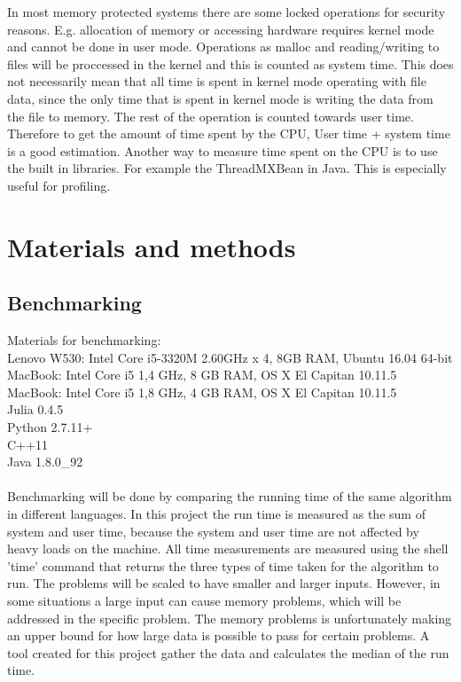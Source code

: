 \documentclass[a4paper, 11pt, titlepage]{article}
\begin{document}
In most memory protected systems there are some locked operations for security reasons. E.g. allocation of memory or accessing hardware requires kernel mode and cannot be done in user mode. Operations as malloc and reading/writing to files will be proccessed in the kernel and this is counted as system time. This does not necessarily mean that all time is spent in kernel mode operating with file data, since the only time that is spent in kernel mode is writing the data from the file to memory. The rest of the operation is counted towards user time. Therefore to get the amount of time spent by the CPU, User time + system time is a good estimation. Another way to measure time spent on the CPU is to use the built in libraries. For example the ThreadMXBean in Java. This is especially useful for profiling.

\section{Materials and methods}
\subsection{Benchmarking}
Materials for benchmarking: \\
Lenovo W530: Intel Core i5-3320M 2.60GHz x 4, 8GB RAM, Ubuntu 16.04 64-bit\\
MacBook: Intel Core i5 1,4 GHz, 8 GB RAM, OS X El Capitan 10.11.5\\
MacBook: Intel Core i5 1,8 GHz, 4 GB RAM, OS X El Capitan 10.11.5\\
Julia 0.4.5 \\
Python 2.7.11+ \\
C++11 \\
Java 1.8.0\_92 \\\\
Benchmarking will be done by comparing the running time of the same algorithm in different languages. In this project the run time is measured as the sum of system and user time, because the system and user time are not affected by heavy loads on the machine. All time measurements are measured using the shell 'time' command that returns the three types of time taken for the algorithm to run. The problems will be scaled to have smaller and larger inputs. However, in some situations a large input can cause memory problems, which will be addressed in the specific problem. The memory problems is unfortunately making an upper bound for how large data is possible to pass for certain problems. A tool created for this project gather the data and calculates the median of the run time. 
\end{document}
